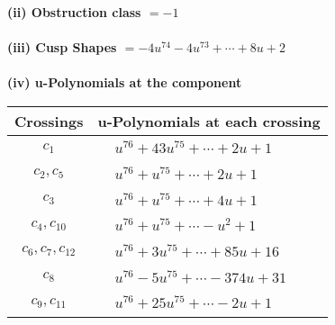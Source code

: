 \documentclass[1p]{elsarticle_modified}
\theoremstyle{definition}
\begin{document}
\flushleft \textbf{(ii) Obstruction class $= -1$}\\~\\
\flushleft \textbf{(iii) Cusp Shapes $= -4 u^{74}-4 u^{73}+\cdots+8 u+2$}\\~\\
\newpage\renewcommand{\arraystretch}{1}
\flushleft \textbf{(iv) u-Polynomials at the component}\newline \\
\begin{tabular}{m{50pt}|m{274pt}}
Crossings & \hspace{64pt}u-Polynomials at each crossing \\
\hline $$\begin{aligned}c_{1}\end{aligned}$$&$\begin{aligned}
&u^{76}+43 u^{75}+\cdots+2 u+1
\end{aligned}$\\
\hline $$\begin{aligned}c_{2},c_{5}\end{aligned}$$&$\begin{aligned}
&u^{76}+u^{75}+\cdots+2 u+1
\end{aligned}$\\
\hline $$\begin{aligned}c_{3}\end{aligned}$$&$\begin{aligned}
&u^{76}+u^{75}+\cdots+4 u+1
\end{aligned}$\\
\hline $$\begin{aligned}c_{4},c_{10}\end{aligned}$$&$\begin{aligned}
&u^{76}+u^{75}+\cdots- u^2+1
\end{aligned}$\\
\hline $$\begin{aligned}c_{6},c_{7},c_{12}\end{aligned}$$&$\begin{aligned}
&u^{76}+3 u^{75}+\cdots+85 u+16
\end{aligned}$\\
\hline $$\begin{aligned}c_{8}\end{aligned}$$&$\begin{aligned}
&u^{76}-5 u^{75}+\cdots-374 u+31
\end{aligned}$\\
\hline $$\begin{aligned}c_{9},c_{11}\end{aligned}$$&$\begin{aligned}
&u^{76}+25 u^{75}+\cdots-2 u+1
\end{aligned}$\\
\hline
\end{tabular}\\~\\
\end{document}
